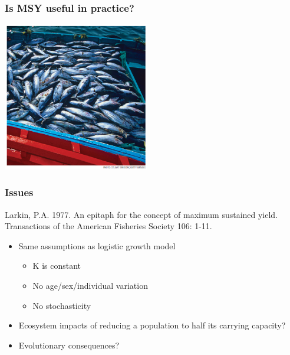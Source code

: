 \documentclass[color=usenames,dvipsnames,handout]{beamer}\usepackage[]{graphicx}\usepackage[]{color}
\begin{document}





\begin{frame}
  \frametitle{Is MSY useful in practice?}
  \begin{center}
 \includegraphics[height=6.5cm,keepaspectratio]{figs/tuna}
  \end{center}
\end{frame}




\begin{frame}
  \frametitle{Issues}
  {\flushleft Larkin, P.A. 1977. An epitaph for the concept of maximum
    sustained yield. Transactions of the American Fisheries Society 106: 1-11. \par}
  \pause
  \begin{itemize}%
    \item Same assumptions as logistic growth model
      \begin{itemize}
        \item<3-> K is constant
        \item<3-> No age/sex/individual variation
        \item<3-> No stochasticity
      \end{itemize}
    \item<4-> Ecosystem impacts of reducing a population
      to half its carrying capacity?
    \item<5-> Evolutionary consequences?
  \end{itemize}
\end{frame}
\end{document}
